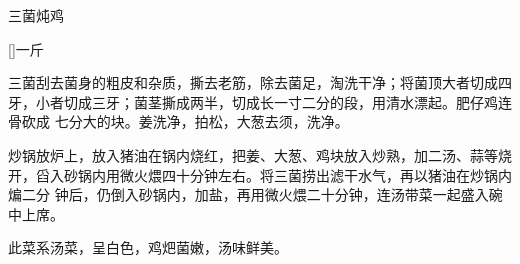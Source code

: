 %
%
%
%
%
%
%
\begin{recipe}{三菌炖鸡}

\ingredients

[\footnotemark]{一斤}

\preparation

\step 三菌刮去菌身的粗皮和杂质，撕去老筋，除去菌足，淘洗干净；将菌顶大者切成四
牙，小者切成三牙；菌茎撕成两半，切成长一寸二分的段，用清水漂起。肥仔鸡连骨砍成
七分大的块。姜洗净，拍松，大葱去须，洗净。

\step 炒锅放炉上，放入猪油在锅内烧红，把姜、大葱、鸡块放入炒熟，加二汤、蒜等烧
开，舀入砂锅内用微火煨四十分钟左右。将三菌捞出滤干水气，再以猪油在炒锅内煸二分
钟后，仍倒入砂锅内，加盐，再用微火煨二十分钟，连汤带菜一起盛入碗中上席。

\features

此菜系汤菜，呈白色，鸡𤆵菌嫩，汤味鲜美。


\end{recipe}

